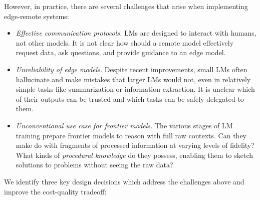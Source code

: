 



However, in practice, there are several challenges that arise when implementing edge-remote systems: 

\begin{itemize}
    \item \emph{Effective communication protocols.} LMs are designed to interact with humans, not other models. It is not clear how should a remote model effectively request data, ask questions, and provide guidance to an edge model.
    \item \emph{Unreliability of edge models.} Despite recent improvements, small LMs often hallucinate and make mistakes that larger LMs would not, even in relatively simple tasks like summarization or information extraction. It is unclear which of their outputs can be trusted and which tasks can be safely delegated to them.
    \item \emph{Unconventional use case for frontier models.} The various stages of LM training prepare frontier models to reason with full raw contexts. Can they make do with fragments of processed information at varying levels of fidelity? What kinds of \emph{procedural knowledge} do they possess, enabling them to sketch solutions to problems without seeing the raw data?
\end{itemize}

We identify three key design decisions which address the challenges above and improve the cost-quality tradeoff:

